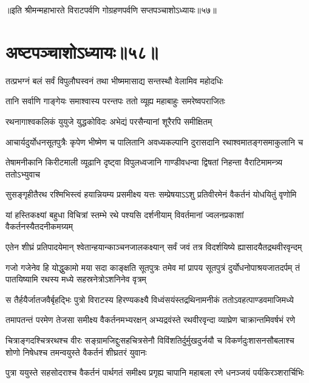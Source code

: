 ॥इति श्रीमन्महाभारते विराटपर्वणि गोग्रहणपर्वणि सप्तपञ्चाशोऽध्यायः॥५७॥

\chapter{अष्टपञ्चाशोऽध्यायः॥५८॥}

\twolineshloka
{तत्प्रभग्नं बलं सर्वं विपुलौघस्वनं तथा}
{भीष्ममासाद्य सन्तस्थौ वेलामिव महोदधिः}


\twolineshloka
{तानि सर्वाणि गाङ्गेयः समाश्वास्य परन्तपः}
{ततो व्यूह्य महाबाहुः समरेष्वपराजितः}


\twolineshloka
{रथनागाश्वकलिकं युयुजे युद्धकोविदः}
{अभेद्यं परसैन्यानां शूरैरपि समीक्षितम्}


\fourlineindentedshloka
{आचार्यदुर्योधनसूतपुत्रैः}
{कृपेण भीष्मेण च पालितानि}
{अवध्यकल्पानि दुरासदानि}
{रथाश्वमातङ्गसमाकुलानि च}


\fourlineindentedshloka
{तेषामनीकानि किरीटमाली}
{व्यूढानि दृष्ट्वा विपुलध्वजानि}
{गाण्डीवधन्वा द्विषतां निहन्ता}
{वैराटिमामन्त्र्य ततोऽभ्युवाच}


\fourlineindentedshloka
{सुसङ्गृहीतैरथ रश्मिभिस्त्वं}
{हयान्नियम्य प्रसमीक्ष्य यत्तः}
{सम्प्रेषयाऽऽशु प्रतिवीरमेनं}
{वैकर्तनं योधयितुं वृणोमि}


\fourlineindentedshloka
{यां हस्तिकक्ष्यां बहुधा विचित्रां}
{स्तम्भे रथे पश्यसि दर्शनीयाम्}
{विवर्तमानां ज्वलनप्रकाशां}
{वैकर्तनस्यैतदनीकमग्र्यम्}


\fourlineindentedshloka
{एतेन शीघ्रं प्रतिपादयेमान्}
{श्वेतान्हयान्काञ्चनजालकक्ष्यान्}
{सर्वं जवं तत्र विदर्शयिष्ये}
{ह्यासादयैतद्रथवीरवृन्दम्}


\sixlineindentedshloka
{गजो गजेनेव हि योद्धुकामो}
{मया सदा काङ्क्षति सूतपुत्रः}
{तमेव मां प्रापय सूतपुत्रं}
{दुर्योधनोपाश्रयजातदर्पम्}
{तं पातयिष्यामि रथस्य मध्ये}
{सहस्रनेत्रोऽशनिनेव वृत्रम्}



\fourlineindentedshloka
{स तैर्हयैर्जातजवैर्बृहद्भिः}
{पुत्रो विराटस्य हिरण्यकक्ष्यै}
{विध्वंसयंस्तद्रथिनामनीकं}
{ततोऽवहत्पाण्डवमाजिमध्ये}


\fourlineindentedshloka
{तमापतन्तं परमेण तेजसा}
{समीक्ष्य वैकर्तनमभ्यरक्षन्}
{अभ्यद्रवंस्ते रथवीरवृन्दा}
{व्याघ्रेण चाक्रान्तमिवर्षभं रणे}


\sixlineindentedshloka
{चित्राङ्गदश्चित्ररथश्च वीरः}
{सङ्ग्रामजिद्दुःसहचित्रसेनौ}
{विविंशतिर्दुर्मुखदुर्जयौ च}
{विकर्णदुःशासनसौबलाश्च}
{शोणो निषेधश्च तमन्वयुस्ते}
{वैकर्तनं शीघ्रतरं युवानः}


\fourlineindentedshloka
{पुत्रा ययुस्ते सहसोदराश्च}
{वैकर्तनं पार्थगतं समीक्ष्य}
{प्रगृह्य चापानि महाबला रणे}
{धनञ्जयं पर्यकिरञ्शरार्चिभिः}


